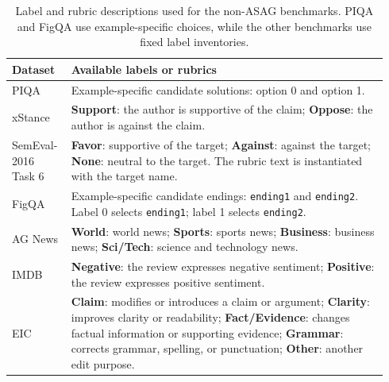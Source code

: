 \begin{table}[t]
\centering
\small
\begin{tabular}{p{0.14\linewidth}p{0.80\linewidth}}
\toprule
\textbf{Dataset} & \textbf{Available labels or rubrics} \\
\midrule
PIQA & Example-specific candidate solutions: option 0 and option 1. \\
xStance & \textbf{Support}: the author is supportive of the claim; \textbf{Oppose}: the author is against the claim. \\
SemEval-2016 Task 6 & \textbf{Favor}: supportive of the target; \textbf{Against}: against the target; \textbf{None}: neutral to the target. The rubric text is instantiated with the target name. \\
FigQA & Example-specific candidate endings: \texttt{ending1} and \texttt{ending2}. Label 0 selects \texttt{ending1}; label 1 selects \texttt{ending2}. \\
AG News & \textbf{World}: world news; \textbf{Sports}: sports news; \textbf{Business}: business news; \textbf{Sci/Tech}: science and technology news. \\
IMDB & \textbf{Negative}: the review expresses negative sentiment; \textbf{Positive}: the review expresses positive sentiment. \\
EIC & \textbf{Claim}: modifies or introduces a claim or argument; \textbf{Clarity}: improves clarity or readability; \textbf{Fact/Evidence}: changes factual information or supporting evidence; \textbf{Grammar}: corrects grammar, spelling, or punctuation; \textbf{Other}: another edit purpose. \\
\bottomrule
\end{tabular}
\caption{Label and rubric descriptions used for the non-ASAG benchmarks. PIQA and FigQA use example-specific choices, while the other benchmarks use fixed label inventories.}
\label{tab:non_asag_labels}
\end{table}

